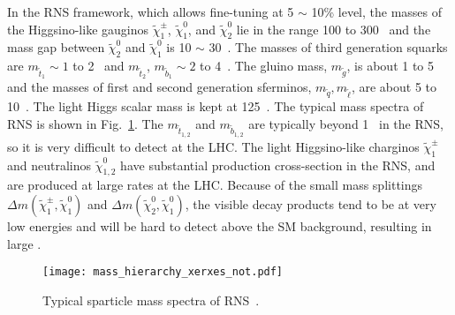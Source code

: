 %
In the RNS framework, which allows fine-tuning at 5 $\sim$ 10\% level, the masses of the Higgsino-like gauginos $\widetilde{\chi}^{\pm}_{1}$, $\widetilde{\chi}^{0}_{1}$, and $\widetilde{\chi}^{0}_{2}$ lie in the range 100 to 300~{\GeV} and the mass gap between $\widetilde{\chi}^{0}_{2}$ and $\widetilde{\chi}^{0}_{1}$ is 10 $\sim$ 30~{\GeV}.
The masses of third generation squarks are $m_{\widetilde{t}_{1}} \sim 1$ to 2~{\TeV} and $m_{\widetilde{t}_{2}}$, $m_{\widetilde{b}_{1}} \sim 2$ to 4~{\TeV}.
The gluino mass, $m_{\widetilde{g}}$, is about 1 to 5~{\TeV} and the masses of first and second generation sferminos, $m_{\widetilde{q}}, m_{\widetilde{\ell}}$, are about 5 to 10~{\TeV}.
The light Higgs scalar mass is kept at 125~{\GeV}.
The typical mass spectra of RNS is shown in Fig.~\ref{fig:susy_RNS_mass_spectra}.
The $m_{\widetilde{t}_{1,2}}$ and $m_{\widetilde{b}_{1,2}}$ are typically beyond 1~{\TeV} in the RNS, so it is very difficult to detect at the LHC.  
The light Higgsino-like charginos $\widetilde{\chi}^{\pm}_{1}$ and neutralinos $\widetilde{\chi}^{0}_{1,2}$ have substantial production cross-section in the RNS, and are produced at large rates at the LHC.
Because of the small mass splittings $\Delta m(\widetilde{\chi}^{\pm}_{1}, \widetilde{\chi}^{0}_{1})$ and $\Delta m(\widetilde{\chi}^{0}_{2}, \widetilde{\chi}^{0}_{1})$, the visible decay products tend to be at very low energies and will be hard to detect above the SM background, resulting in large \met.

\begin{figure}[htb]
    \begin{center}
        \texttt{[image: mass\_hierarchy\_xerxes\_not.pdf]}
        \caption{Typical sparticle mass spectra of RNS~\cite{Baer:2013gva}.}
        \label{fig:susy_RNS_mass_spectra}
    \end{center}
\end{figure}


